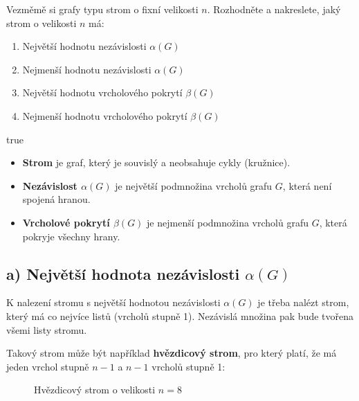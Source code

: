 \documentclass[10pt, a4paper]{ReportSheet}
\begin{document}
    \begin{uloha}{9}{2}{
        Vezměmě si grafy typu strom o fixní velikosti $n$. Rozhodněte a nakreslete, jaký strom o velikosti $n$ má:
        \begin{enumerate}
            \renewcommand{\theenumi}{\alph{enumi}}
            \item Největší hodnotu nezávislosti $\alpha(G)$
            \item Nejmenší hodnotu nezávislosti $\alpha(G)$
            \item Největší hodnotu vrcholového pokrytí $\beta(G)$
            \item Nejmenší hodnotu vrcholového pokrytí $\beta(G)$
        \end{enumerate}
    }{true}
        \begin{itemize}
            \item \textbf{Strom} je graf, který je souvislý a neobsahuje cykly (kružnice).
            \item \textbf{Nezávislost $\alpha(G)$} je největší podmnožina vrcholů grafu $G$, která není spojená hranou.
            \item \textbf{Vrcholové pokrytí $\beta(G)$} je nejmenší podmnožina vrcholů grafu $G$, která pokryje všechny hrany.
        \end{itemize}

        \subsection{a) Největší hodnota nezávislosti $\alpha(G)$}
        K nalezení stromu s největší hodnotou nezávislosti $\alpha(G)$ je třeba nalézt strom, který má co nejvíce listů (vrcholů stupně 1). Nezávislá množina pak bude tvořena všemi listy stromu.

        Takový strom může být například \textbf{hvězdicový strom}, pro který platí, že má jeden vrchol stupně $n-1$ a $n-1$ vrcholů stupně 1:
        \begin{figure}[H]
            \centering
            \caption{Hvězdicový strom o velikosti $n=8$}
            \label{fig:ukol-2-9-hvezdicovy-strom}
        \end{figure}


\end{uloha}
\end{document}

